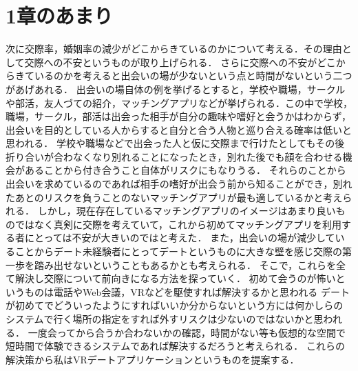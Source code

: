 \documentclass[12pt]{ltjsarticle}
\begin{document}
\section{1章のあまり}
次に交際率，婚姻率の減少がどこからきているのかについて考える．その理由として交際への不安というものが取り上げられる．
さらに交際への不安がどこからきているのかを考えると出会いの場が少ないという点と時間がないという二つがあげあれる．
出会いの場自体の例を挙げるとすると，学校や職場，サークルや部活，友人づての紹介，マッチングアプリなどが挙げられる．この中で学校，職場，サークル，部活は出会った相手が自分の趣味や嗜好と会うかはわからず，出会いを目的としている人からすると自分と合う人物と巡り合える確率は低いと思われる\cite{suda2020}．
学校や職場などで出会った人と仮に交際まで行けたとしてもその後折り合いが合わなくなり別れることになったとき，別れた後でも顔を合わせる機会があることから付き合うこと自体がリスクにもなりうる．
それらのことから出会いを求めているのであれば相手の嗜好が出会う前から知ることができ，別れたあとのリスクを負うことのないマッチングアプリが最も適しているかと考えられる．
しかし，現在存在しているマッチングアプリのイメージはあまり良いものではなく真剣に交際を考えていて，これから初めてマッチングアプリを利用する者にとっては不安が大きいのではと考えた\cite{suda2021}．
また，出会いの場が減少していることからデート未経験者にとってデートというものに大きな壁を感じ交際の第一歩を踏み出せないということもあるかとも考えられる．
そこで，これらを全て解決し交際について前向きになる方法を探っていく．
初めて会うのが怖いというものは電話やWeb会議，VRなどを駆使すれば解決するかと思われる
デートが初めてでどういったようにすればいいか分からないという方には何かしらのシステムで行く場所の指定をすれば外すリスクは少ないのではないかと思われる．
一度会ってから合うか合わないかの確認，時間がない\cite{suda2019}等も仮想的な空間で短時間で体験できるシステムであれば解決するだろうと考えられる．
これらの解決策から私はVRデートアプリケーションというものを提案する．
\end{document}
